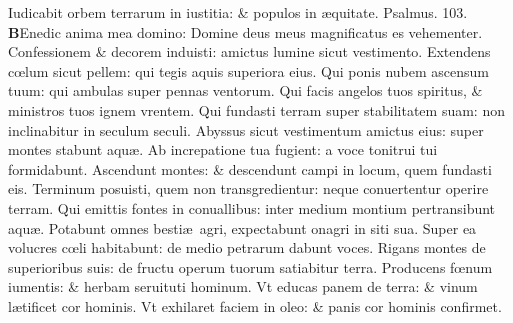\documentclass[a5paper,10pt]{book}
\def\ae{æ}
\def\oe{œ}
\begin{document}
\begin{multicols*}{2}
\newline \color{red} I\color{black}udicabit orbem terrarum in iustitia: \& populos in \ae quitate. \quad \color{red} Psalmus. \hypertarget{ps103}{103.} \color{black}
\vspace{-.5em}
\lettrine[lines=2]{\bfseries \color{red} B}{}Enedic anima mea domino: Domine deus meus magnificatus es vehementer.
\newline \color{red} C\color{black}onfessionem \& decorem induisti: amictus lumine sicut vestimento.
\newline \color{red} E\color{black}xtendens c\oe lum sicut pellem: qui tegis aquis superiora eius.
\newline \color{red} Q\color{black}ui ponis nubem ascensum tuum: qui ambulas super pennas ventorum.
\newline \color{red} Q\color{black}ui facis angelos tuos spiritus, \& ministros tuos ignem vrentem.
\newline \color{red} Q\color{black}ui fundasti terram super stabilitatem suam: non inclinabitur in seculum seculi.
\newline \color{red} A\color{black}byssus sicut vestimentum amictus eius: super montes stabunt aqu\ae .
\newline \color{red} A\color{black}b increpatione tua fugient: a voce tonitrui tui formidabunt.
\newline \color{red} A\color{black}scendunt montes: \& descendunt campi in locum, quem fundasti eis.
\newline \color{red} T\color{black}erminum posuisti, quem non transgredientur: neque conuertentur operire terram.
\newline \color{red} Q\color{black}ui emittis fontes in conuallibus: inter medium montium pertransibunt aqu\ae .
\newline \color{red} P\color{black}otabunt omnes besti\ae \ agri, expectabunt onagri in siti sua.
\newline \color{red} S\color{black}uper ea volucres c\oe li habitabunt: de medio petrarum dabunt voces.
\newline \color{red} R\color{black}igans montes de superioribus suis: de fructu operum tuorum satiabitur terra.
\newline \color{red} P\color{black}roducens f\oe num iumentis: \& herbam seruituti hominum.
\newline \color{red} V\color{black}t educas panem de terra: \& vinum l\ae tificet cor hominis.
\newline \color{red} V\color{black}t exhilaret faciem in oleo: \& panis cor hominis confirmet.

\end{multicols*}
\end{document}
